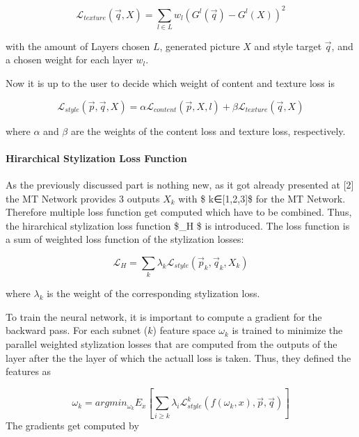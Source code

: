 \documentclass[11pt]{article}
\begin{document}
\begin{equation}
 \mathcal{L}_{texture}(\vec{q}, X) = \sum_{l∈L}w_l(G^l(\vec{q})-G^l(X))^2
\end{equation}

with the amount of Layers chosen \(L\), generated picture \(X\) and
style target \(\vec{q}\), and a chosen weight for each layer \(w_l\).

Now it is up to the user to decide which weight of content and texture
loss is

\begin{equation}
\mathcal{L}_{style}(\vec{p},\vec{q}, X) =\alpha \mathcal{L}_{content}(\vec{p}, X, l ) +\beta \mathcal{L}_{texture}(\vec{q}, X)
\end{equation}

where \(\alpha\) and \(\beta\) are the weights of the content loss and
texture loss, respectively.

\paragraph{Hirarchical Stylization Loss
Function}\label{hirarchical-stylization-loss-function}

As the previously discussed part is nothing new, as it got already
presented at {[}2{]} the MT Network provides 3 outputs \(X_k\) with \$
k∈{[}1,2,3{]}\$ for the MT Network. Therefore multiple loss function get
computed which have to be combined. Thus, the hirarchical stylization
loss function \$\_H \$ is introduced. The loss function is a
sum of weighted loss function of the stylization losses:

\begin{equation}
\mathcal{L}_H = \sum_k \lambda_k \mathcal{L}_{style}(\vec{p}_k,\vec{q}_k, X_k) 
\end{equation}

where \(\lambda_k\) is the weight of the corresponding stylization loss.

To train the neural network, it is important to compute a gradient for
the backward pass. For each subnet (\(k\)) feature space \(\omega_k\) is
trained to minimize the parallel weighted stylization losses that are
computed from the outputs of the layer after the the layer of which the
actuall loss is taken. Thus, they defined the features as

\[\omega_k=argmin_{\omega_k}E_x\left[\sum_{i\geq k} \lambda_i \mathcal{L}^k_{style}(f(\omega_k,x),\vec p ,\vec q) \right]\]
The gradients get computed by
\end{document}
